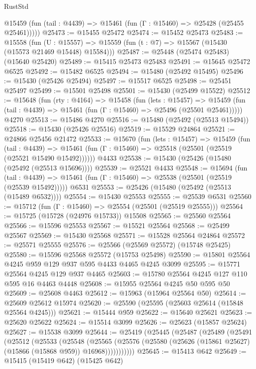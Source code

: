 \begin{lexlean}{RustStd}
\begin{coremodule}
{\begin{coremodule}
{{{{{{{{{{{{{{{{{{{{{{{{{{{{{{{{{{{{{{{{{{{{{{{{{{{{{{{{{{{{      @15459 (fun (tail : @4439) => @15461 (fun (Γ : @15460) => @25428 (@25455 @25461)))))
@25473 := @15455 @25472
@25474 := @15452 @25473
@25483 := @15558
    (fun (U : @15557) => @15559 (fun (t : @7) => @15567 (@15430 (@15573 @21469 @15448) @15584)))
@25487 := @25448 (@25474 @25483) (@15640 @25420)
@25489 := @15415 @25473 @25483
@25491 := @15645 @25472 @6525
@25492 := @15482 @6525
@25494 := @15480 (@25492 @15495)
@25496 := @15430 (@25426 @25494)
@25497 := @15517 @6525
@25498 := @25451 @25497
@25499 := @15501 @25498
@25501 := @15430 (@25499 @15522)
@25512 := @15648
    (fun (rty : @4164) =>
    @15458
      (fun (lets : @15457) =>
      @15459 (fun (tail : @4439) => @15461 (fun (Γ : @15460) => @25496 (@25501 @25461)))))
    @4270
@25513 := @15486 @4270
@25516 := @15480 (@25492 (@25513 @15494))
@25518 := @15430 (@25426 @25516)
@25519 := @15529 @24864
@25521 := @24866 @25456 @21472
@25533 := @15670
    (fun (lets : @15457) =>
    @15459
      (fun (tail : @4439) =>
      @15461 (fun (Γ : @15460) => @25518 (@25501 (@25519 (@25521 @15490 @15492))))))
    @4433
@25538 := @15430 (@25426 (@15480 (@25492 (@25513 @15696))))
@25539 := @25521 @4433
@25548 := @15694
    (fun (tail : @4439) => @15461 (fun (Γ : @15460) => @25538 (@25501 (@25519 (@25539 @15492)))))
    @6531
@25553 := @25426 (@15480 (@25492 (@25513 (@15489 @6532))))
@25554 := @15430 @25553
@25555 := @25539 @6531
@25560 := @15712 (fun (Γ : @15460) => @25554 (@25501 (@25519 @25555)))
@25564 := @15725 (@15728 (@24976 @15733)) @15508
@25565 := @25560 @25564
@25566 := @15596 @25553
@25567 := @15521 @25564
@25568 := @25499 @25567
@25569 := @15430 @25568
@25571 := @15528 @25564 @24864
@25572 := @25571 @25555
@25576 := @25566 (@25569 @25572) (@15748 @25425)
@25580 := @15596 @25568 @25572 (@15753 @25498)
@25590 := @15801 @25564 @4245 @959 @129 @937 @595 @4433 @4465 @4245 @3099
@25595 := @15771 @25564 @4245 @129 @937 @4465
@25603 := @15780 @25564 @4245 @127 @110 @595 @16 @4463 @4448
@25608 := @15955 @25564 @4245 @50 @595 @50
@25609 := @25608 @4463
@25612 := @15963 (@15964 @25564 @50)
@25614 := @25609 @25612 @15974
@25620 := @25590 (@25595 (@25603 @25614 (@15848 @25564 @4245)))
@25621 := @15444 @959
@25622 := @15640 @25621
@25623 := @25620 @25622
@25624 := @15514 @3099
@25626 := @25623 (@15857 @25624)
@25627 := @15538 @3099
@25644 := @25419
    (@25445
      (@25487
        (@25489
          (@25491
            (@25512
              (@25533
                (@25548
                  (@25565
                    (@25576 (@25580 (@25626 (@15861 @25627) (@15866 (@15868 @959)) @16968)))))))))))
@25645 := @15413 @642
@25649 := @15415 (@15419 @642) (@15425 @642)
}}}}}}}}}}}}}}}}}}}}}}}}}}}}}}}}}}}}}}}}}}}}}}}}}}}}}}}}}}}}
\end{coremodule}}
\end{coremodule}
\end{lexlean}
